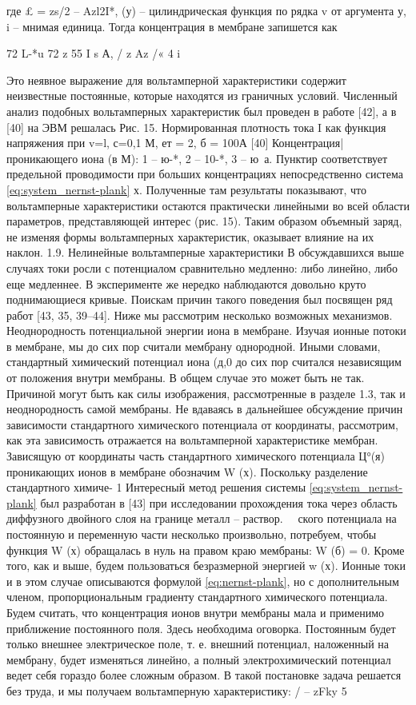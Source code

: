 {где £ = zs/2 -- Azl2I*, (у) -- цилиндрическая функция по
рядка v от аргумента у, i -- мнимая единица. Тогда концентрация в мембране запишется как


72
L-*u
72
z 55
I s А,
/ z Az \*/«
4 i


Это неявное выражение для вольтамперной характеристики содержит неизвестные постоянные, которые находятся из граничных условий. Численный анализ подобных вольтамперных характеристик был проведен в работе [42], а в [40] на ЭВМ решалась
Рис. 15. Нормированная плотность тока I как функция напряжения при v=l, с=0,1 М, ет = 2, б = 100А [40]
Концентрация| проникающего иона (в М):
1 -- ю-*,
2 -- 10-*, 3 -- ю~а.
Пунктир соответствует предельной проводимости при больших концентрациях
непосредственно система \eqref{eq:system_nernst-plank} х. Полученные там результаты показывают, что вольтамперные характеристики остаются практически линейными во всей области параметров, представляющей интерес (рис. 15). Таким образом объемный заряд, не изменяя формы вольтамперных характеристик, оказывает влияние на их наклон.
1.9. Нелинейные вольтамперные характеристики
В обсуждавшихся выше случаях токи росли с потенциалом сравнительно медленно: либо линейно, либо еще медленнее. В эксперименте же нередко наблюдаются довольно круто поднимающиеся кривые. Поискам причин такого поведения был посвящен ряд работ [43, 35, 39--44]. Ниже мы рассмотрим несколько возможных механизмов.
Неоднородность потенциальной энергии иона в мембране. Изучая ионные потоки в мембране, мы до сих пор считали мембрану однородной. Иными словами, стандартный химический потенциал иона (д,0 до сих пор считался независящим от положения внутри мембраны. В общем случае это может быть не так. Причиной могут быть как силы изображения, рассмотренные в разделе 1.3, так и неоднородность самой мембраны. Не вдаваясь в дальнейшее обсуждение причин зависимости стандартного химического потенциала от координаты, рассмотрим, как эта зависимость отражается на вольтамперной характеристике мембран.
Зависящую от координаты часть стандартного химического потенциала Ц°(я) проникающих ионов в мембране обозначим W (х). Поскольку разделение стандартного химиче-
1 Интересный метод решения системы \eqref{eq:system_nernst-plank} был разработан в [43] при исследовании прохождения тока через область диффузного двойного слоя на границе металл -- раствор. 
ского потенциала на постоянную и переменную части несколько произвольно, потребуем, чтобы функция W (х) обращалась в нуль на правом краю мембраны: W (б) = 0. Кроме того, как и выше, будем пользоваться безразмерной энергией w (х). Ионные токи и в этом случае описываются формулой \eqref{eq:nernst-plank}, но с дополнительным членом, пропорциональным градиенту стандартного химического потенциала. Будем считать, что концентрация ионов внутри мембраны мала и применимо приближение постоянного поля. Здесь необходима оговорка. Постоянным будет только внешнее электрическое поле, т. е. внешний потенциал, наложенный на мембрану, будет изменяться линейно, а полный электрохимический потенциал ведет себя гораздо более сложным образом. В такой постановке задача решается без труда, и мы получаем вольтамперную характеристику:
/ -- zFky
5

}
